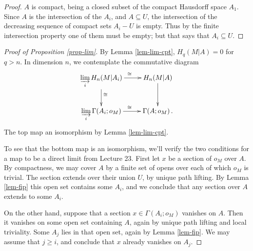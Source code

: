 \begin{proof}
$A$ is compact, being a closed subset of the compact Hausdorff space $A_1$.
Since $A$ is the intersection of the $A_i$, and $A\subseteq U$, 
the intersection of the decreasing sequence of compact sets $A_i-U$ is empty. 
Thus by the finite intersection property one of them must be empty;
but that says that $A_i\subseteq U$. 
\end{proof}
\begin{proof}[Proof of Proposition \ref{prop-lim}]
By Lemma \ref{lem-lim-cpt},
$H_q(M|A)=0$ for $q>n$. In dimension $n$, we contemplate 
the commutative diagram 
\[
\xymatrix{
\displaystyle{\varinjlim_i}\,H_n(M|A_i) \ar[r]^\cong \ar[d]^\cong & 
H_n(M|A) \ar[d] \\
\displaystyle{\varinjlim_i}\,\Gamma(A_i;o_M) \ar[r]^\cong & \Gamma(A;o_M) \,.
}\]
The top map an isomorphism by Lemma \ref{lem-lim-cpt}.

To see that the bottom map is an isomorphism, we'll verify the two 
conditions for a map to be a direct limit from Lecture 23.
First let $x$ be a section
of $o_M$ over $A$. By compactness, we may cover $A$ by a finite set of 
opens over each of which $o_M$ is trivial. 
The section extends over their union $U$, by unique path 
lifting. By Lemma \ref{lem-fip} this open set contains some $A_i$, 
and we conclude that any section over $A$ extends to some $A_i$. 

On the other hand, suppose that a section $x\in\Gamma(A_i;o_M)$ 
vanishes on $A$. Then it vanishes on some open set containing $A$,
again by unique path lifting and local triviality. Some $A_j$ lies
in that open set, again by Lemma \ref{lem-fip}. We may assume that 
$j\geq i$, and conclude that $x$ already vanishes on $A_j$.
\end{proof}


